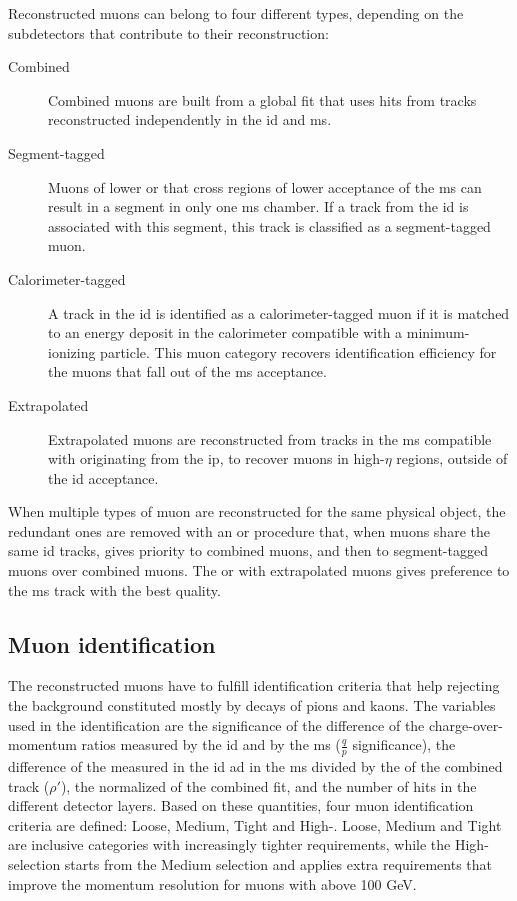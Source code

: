 Reconstructed muons can belong to four different types, depending on the subdetectors that contribute to their reconstruction:

\begin{description}
\item [Combined] Combined muons are built from a global fit that uses hits from tracks reconstructed independently in the \gls{id} and \gls{ms}.
\item[Segment-tagged] Muons of lower \pt or that cross regions of lower acceptance of the \gls{ms} can result in a segment in only one \gls{ms} chamber. If a track from the \gls{id} is associated with this segment, this track is classified as a segment-tagged muon.
\item[Calorimeter-tagged] A track in the \gls{id} is identified as a calorimeter-tagged muon if it is matched to an energy deposit in the calorimeter compatible with a minimum-ionizing particle. This muon category recovers identification efficiency for the muons that fall out of the \gls{ms} acceptance.
\item[Extrapolated] Extrapolated muons are reconstructed from tracks in the \gls{ms} compatible with originating from the \gls{ip}, to recover muons in high-$\eta$ regions, outside of the \gls{id} acceptance.
\end{description}

When multiple types of muon are reconstructed for the same physical object, the redundant ones are removed with an \gls{or} procedure that, when muons share the same \gls{id} tracks, gives priority to combined muons, and then to segment-tagged muons over combined muons. The \gls{or} with extrapolated muons gives preference to the \gls{ms} track with the best quality.

\subsection{Muon identification}
\label{sec:muon_id}

The reconstructed muons have to fulfill identification criteria that help rejecting the background constituted mostly by decays of pions and kaons. 
The variables used in the identification are the significance of the difference of the charge-over-momentum ratios measured by the \gls{id} and by the \gls{ms} ($\frac{q}{p}$ significance),
the difference of the \pt measured in the \gls{id} ad in the \gls{ms} divided by the \pt of the combined track ($\rho'$),
the normalized \chis of the combined fit,
and the number of hits in the different detector layers. 
Based on these quantities, four muon identification criteria are defined: Loose, Medium, Tight and High-\pt. 
Loose, Medium and Tight are inclusive categories with increasingly tighter requirements, while the High-\pt selection starts from the Medium selection and applies extra requirements that improve the momentum resolution for muons with \pt above 100 GeV.

